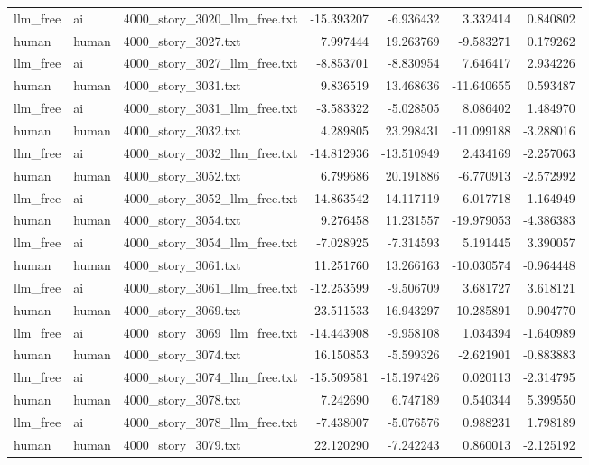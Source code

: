 \begin{longtable}{lllrrrr}
llm\_free & ai & 4000\_story\_3020\_llm\_free.txt & -15.393207 & -6.936432 & 3.332414 & 0.840802 \\
human & human & 4000\_story\_3027.txt & 7.997444 & 19.263769 & -9.583271 & 0.179262 \\
llm\_free & ai & 4000\_story\_3027\_llm\_free.txt & -8.853701 & -8.830954 & 7.646417 & 2.934226 \\
human & human & 4000\_story\_3031.txt & 9.836519 & 13.468636 & -11.640655 & 0.593487 \\
llm\_free & ai & 4000\_story\_3031\_llm\_free.txt & -3.583322 & -5.028505 & 8.086402 & 1.484970 \\
human & human & 4000\_story\_3032.txt & 4.289805 & 23.298431 & -11.099188 & -3.288016 \\
llm\_free & ai & 4000\_story\_3032\_llm\_free.txt & -14.812936 & -13.510949 & 2.434169 & -2.257063 \\
human & human & 4000\_story\_3052.txt & 6.799686 & 20.191886 & -6.770913 & -2.572992 \\
llm\_free & ai & 4000\_story\_3052\_llm\_free.txt & -14.863542 & -14.117119 & 6.017718 & -1.164949 \\
human & human & 4000\_story\_3054.txt & 9.276458 & 11.231557 & -19.979053 & -4.386383 \\
llm\_free & ai & 4000\_story\_3054\_llm\_free.txt & -7.028925 & -7.314593 & 5.191445 & 3.390057 \\
human & human & 4000\_story\_3061.txt & 11.251760 & 13.266163 & -10.030574 & -0.964448 \\
llm\_free & ai & 4000\_story\_3061\_llm\_free.txt & -12.253599 & -9.506709 & 3.681727 & 3.618121 \\
human & human & 4000\_story\_3069.txt & 23.511533 & 16.943297 & -10.285891 & -0.904770 \\
llm\_free & ai & 4000\_story\_3069\_llm\_free.txt & -14.443908 & -9.958108 & 1.034394 & -1.640989 \\
human & human & 4000\_story\_3074.txt & 16.150853 & -5.599326 & -2.621901 & -0.883883 \\
llm\_free & ai & 4000\_story\_3074\_llm\_free.txt & -15.509581 & -15.197426 & 0.020113 & -2.314795 \\
human & human & 4000\_story\_3078.txt & 7.242690 & 6.747189 & 0.540344 & 5.399550 \\
llm\_free & ai & 4000\_story\_3078\_llm\_free.txt & -7.438007 & -5.076576 & 0.988231 & 1.798189 \\
human & human & 4000\_story\_3079.txt & 22.120290 & -7.242243 & 0.860013 & -2.125192 \\

\end{longtable}
